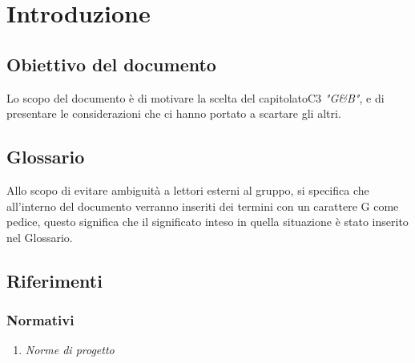\section{Introduzione}
	\subsection{Obiettivo del documento}
		Lo scopo del documento è di motivare la scelta del capitolato\pedice C3 \textit{"G\&B"}, e di presentare le considerazioni che ci hanno portato a scartare gli altri.
	\subsection{Glossario}
		Allo scopo di evitare ambiguità a lettori esterni al gruppo, si specifica che all'interno del documento verranno inseriti dei termini con un carattere G come pedice, questo significa che il significato inteso in quella situazione è stato inserito nel Glossario.
		\subsection{Riferimenti}
			\subsubsection{Normativi}
				\begin{enumerate}
					\item \textit{Norme di progetto}
				\end{enumerate}
